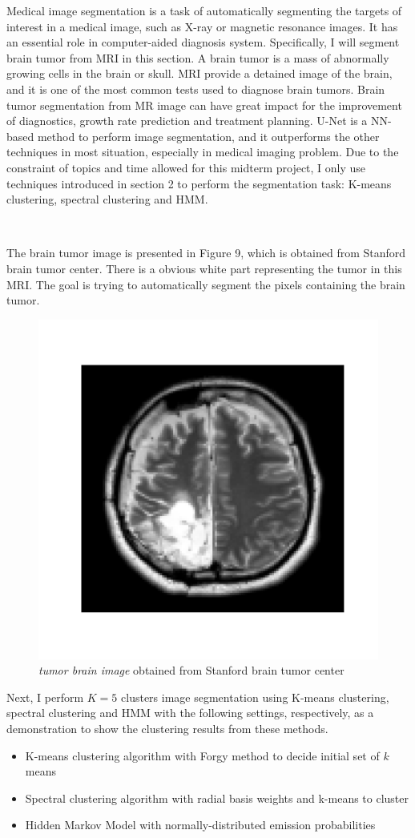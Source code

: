 \documentclass[a4paper]{article}
\begin{document}
Medical image segmentation is a task of automatically segmenting the targets of interest in a medical image, such as X-ray or magnetic resonance images. It has an essential role in computer-aided diagnosis system. Specifically, I will segment brain tumor from MRI in this section. A brain tumor is a mass of abnormally growing cells in the brain or skull. MRI  provide a detained image of the brain, and it is one of the most common tests used to diagnose brain tumors. Brain tumor segmentation from MR image can have great impact for the improvement of diagnostics, growth rate prediction and treatment planning. U-Net is a NN-based method to perform image segmentation, and it outperforms the other techniques in most situation, especially in medical imaging problem.  Due to the constraint of topics and time allowed for this midterm project, I only use techniques introduced in section 2 to perform the segmentation task: K-means clustering, spectral clustering and HMM.

\

The brain tumor image is presented in Figure 9, which is obtained from Stanford brain tumor center. There is a obvious white part representing the tumor in this MRI. The goal is trying to automatically segment the pixels containing the brain tumor.

\begin{figure}[h!]
  \centering
  \includegraphics[width=0.4\linewidth]{../Cluster_results/MRI/MRI.png}
  \caption{\textit{tumor brain image} obtained from Stanford brain tumor center}
\end{figure}


Next, I perform $K=5$ clusters image segmentation using K-means clustering, spectral clustering and HMM with the following settings, respectively, as a demonstration to show the clustering results from these methods.


\begin{itemize}
	\item K-means clustering algorithm with Forgy method to decide initial set of $k$ means
	\item Spectral clustering algorithm with radial basis weights and k-means to cluster
	\item Hidden Markov Model with normally-distributed emission probabilities
\end{itemize}
\end{document}

